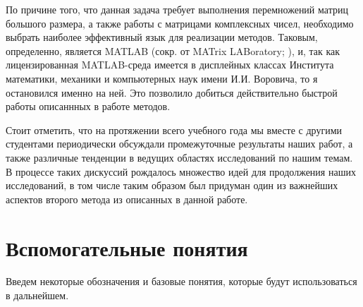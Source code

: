 \documentclass[a4paper]{article}
\theoremstyle{definition}
\begin{document}
    По причине того, что данная задача требует выполнения перемножений матриц большого размера, а также работы с матрицами комплексных чисел, необходимо выбрать наиболее эффективный язык для реализации методов. Таковым, определенно, является MATLAB (сокр. от MATrix LABoratory; \cite{matlab}), и, так как лицензированная MATLAB-среда имеется в дисплейных классах Института математики, механики и компьютерных наук имени И.И. Воровича, то я остановился именно на ней. Это позволило добиться действительно быстрой работы описаннных в работе методов.


    Стоит отметить, что на протяжении всего учебного года мы вместе с другими студентами периодически обсуждали промежуточные результаты наших работ, а также различные тенденции в ведущих областях исследований по нашим темам. В процессе таких дискуссий рождалось множество идей для продолжения наших исследований, в том числе таким образом был придуман один из важнейших аспектов второго метода из описанных в данной работе.


    \newpage

    \section{Вспомогательные понятия}


    Введем некоторые обозначения и базовые понятия, которые будут использоваться в дальнейшем.
\vspace*{0.3cm}
\end{document}
